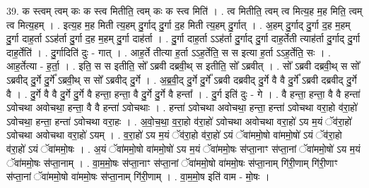 \documentclass[17pt]{extarticle}
\begin{document}
39. क स्त्वम् त्वम् कः क स्त्व मितीति॒ त्वम् कः क स्त्व मिति॑ । . त्व मितीति॒ त्वम् त्व मित्य॒ह म॒ह मिति॒ त्वम् त्व मित्य॒हम् । . इत्य॒ह म॒ह मिती त्य॒हम् दु॒र्गाद् दु॒र्गा द॒ह मिती त्य॒हम् दु॒र्गात् । . अ॒हम् दु॒र्गाद् दु॒र्गा द॒ह म॒हम् दु॒र्गा दाह॒र्ता ऽऽह॑र्ता दु॒र्गा द॒ह म॒हम् दु॒र्गा दाह॑र्ता । . दु॒र्गा दाह॒र्ता ऽऽह॑र्ता दु॒र्गाद् दु॒र्गा दाह॒र्तेती त्याह॑र्ता दु॒र्गाद् दु॒र्गा दाह॒र्तेति॑ । . दु॒र्गादिति॑ दुः - गात् । . आह॒र्ते तीत्या ह॒र्ता ऽऽह॒र्तेति॒ स स इत्या ह॒र्ता ऽऽह॒र्तेति॒ सः । . आह॒र्तेत्या - ह॒र्ता॒ । . इति॒ स स इतीति॒ सो᳚ ऽब्रवी दब्रवी॒थ् स इतीति॒ सो᳚ ऽब्रवीत् । . सो᳚ ऽब्रवी दब्रवी॒थ् स सो᳚ ऽब्रवीद् दु॒र्गे दु॒र्गे᳚ ऽब्रवी॒थ् स सो᳚ ऽब्रवीद् दु॒र्गे । . अ॒ब्र॒वी॒द् दु॒र्गे दु॒र्गे᳚ ऽब्रवी दब्रवीद् दु॒र्गे वै वै दु॒र्गे᳚ ऽब्रवी दब्रवीद् दु॒र्गे वै । . दु॒र्गे वै वै दु॒र्गे दु॒र्गे वै हन्ता॒ हन्ता॒ वै दु॒र्गे दु॒र्गे वै हन्ता᳚ । . दु॒र्ग इति॑ दुः - गे । . वै हन्ता॒ हन्ता॒ वै वै हन्ता॑ ऽवोचथा अवोचथा॒ हन्ता॒ वै वै हन्ता॑ ऽवोचथाः । . हन्ता॑ ऽवोचथा अवोचथा॒ हन्ता॒ हन्ता॑ ऽवोचथा वरा॒हो व॑रा॒हो॑ ऽवोचथा॒ हन्ता॒ हन्ता॑ ऽवोचथा वरा॒हः । . अ॒वो॒च॒था॒ व॒रा॒हो व॑रा॒हो॑ ऽवोचथा अवोचथा वरा॒हो॑ ऽय म॒यं ॅव॑रा॒हो॑ ऽवोचथा अवोचथा वरा॒हो॑ ऽयम् । . व॒रा॒हो॑ ऽय म॒यं ॅव॑रा॒हो व॑रा॒हो॑ ऽयं ॅवा॑ममो॒षो वा॑ममो॒षो॑ ऽयं ॅव॑रा॒हो व॑रा॒हो॑ ऽयं ॅवा॑ममो॒षः । . अ॒यं ॅवा॑ममो॒षो वा॑ममो॒षो॑ ऽय म॒यं ॅवा॑ममो॒षः स॑प्ता॒नाꣳ स॑प्ता॒नां ॅवा॑ममो॒षो॑ ऽय म॒यं ॅवा॑ममो॒षः स॑प्ता॒नाम् । . वा॒म॒मो॒षः स॑प्ता॒नाꣳ स॑प्ता॒नां ॅवा॑ममो॒षो वा॑ममो॒षः स॑प्ता॒नाम् गि॑री॒णाम् गि॑री॒णाꣳ स॑प्ता॒नां ॅवा॑ममो॒षो वा॑ममो॒षः स॑प्ता॒नाम् गि॑री॒णाम् । . वा॒म॒मो॒ष इति॑ वाम - मो॒षः । \newline
\pagebreak
{}
\end{document}
